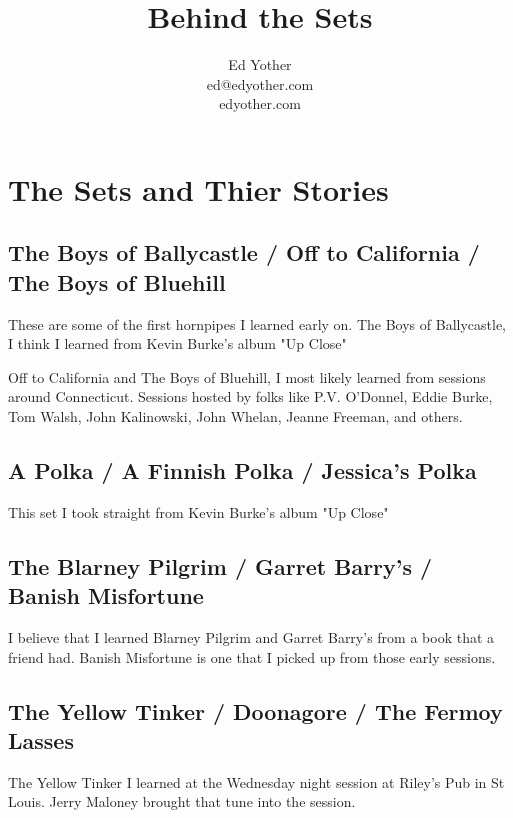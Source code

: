 \documentclass[11pt,letterpaper]{article}
\title{Behind the Sets}
\author{Ed Yother\\ed@edyother.com\\edyother.com}
\begin{document}
\renewcommand{\thesection}{}
\renewcommand{\thesubsection}{}
\maketitle

\tableofcontents

\newpage


\section{The Sets and Thier Stories}

\subsection{The Boys of Ballycastle / Off to California / The Boys of Bluehill}

These are some of the first hornpipes I learned early on. The Boys of Ballycastle, I think I learned from Kevin Burke's album "Up Close"

Off to California and The Boys of Bluehill, I most likely learned from sessions around Connecticut. Sessions hosted by folks like P.V. O'Donnel, Eddie Burke, Tom Walsh, John Kalinowski, John Whelan, Jeanne Freeman, and others.

\subsection{A Polka / A Finnish Polka / Jessica's Polka}

This set I took straight from Kevin Burke's album "Up Close"

\subsection{The Blarney Pilgrim / Garret Barry's / Banish Misfortune}

I believe that I learned Blarney Pilgrim and Garret Barry's from a book that a friend had. Banish Misfortune is one that I picked up from those early sessions.

\subsection{The Yellow Tinker / Doonagore / The Fermoy Lasses}

The Yellow Tinker I learned at the Wednesday night session at Riley's Pub in St Louis. Jerry Maloney brought that tune into the session.
\end{document}
